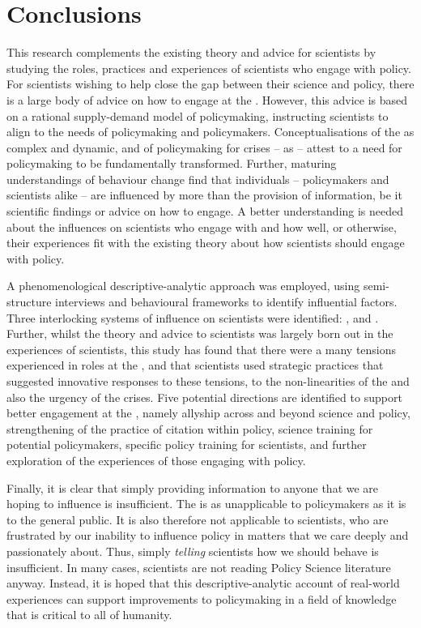 \chapter{Conclusions}\label{ch:conclusions}

This research complements the existing theory and advice for scientists by studying the roles, practices and experiences of scientists who engage with policy. For \CAN{} scientists wishing to help close the gap between their science and \CAN{} policy, there is a large body of advice on how to engage at the \SPI. However, this advice is based on a rational supply-demand model of policymaking, instructing scientists to align to the needs of policymaking and policymakers. Conceptualisations of the \SPI{} as complex and dynamic, and of policymaking for \CAN{} crises -- as \PNS{} -- attest to a need for \CAN{} policymaking to be fundamentally transformed. Further, maturing understandings of behaviour change find that individuals -- policymakers and scientists alike -- are influenced by more than the provision of information, be it scientific findings or advice on how to engage. A better understanding is needed about the influences on scientists who engage with \CAN{} \SPI and how well, or otherwise, their experiences fit with the existing theory about how scientists should engage with policy.

A phenomenological descriptive-analytic approach was employed, using semi-structure interviews and behavioural frameworks to identify influential factors. Three interlocking systems of influence on scientists were identified: \skiinte, \skiknow{} and \skiscip. Further, whilst the theory and advice to scientists was largely born out in the experiences of scientists, this study has found that there were a many tensions experienced in roles at the \SPI, and that scientists used strategic practices that suggested innovative responses to these tensions, to the non-linearities of the \SPI{} and also the urgency of the \CAN{} crises. Five potential directions are identified to support better engagement at the \CAN{} \SPI, namely allyship across and beyond \CAN{} science and policy, strengthening of the practice of citation within policy, science training for potential policymakers, specific policy training for scientists, and further exploration of the experiences of those engaging with policy. 

Finally, it is clear that simply providing information to anyone that we are hoping to influence is insufficient. The \IDM{} is as unapplicable to policymakers as it is to the general public. It is also therefore not applicable to scientists, who are frustrated by our inability to influence policy in matters that we care deeply and passionately about. Thus, simply \emph{telling} scientists how we should behave is insufficient. In many cases, scientists are not reading Policy Science literature anyway. Instead, it is hoped that this descriptive-analytic account of real-world experiences can support improvements to policymaking in a field of knowledge that is critical to all of humanity. 